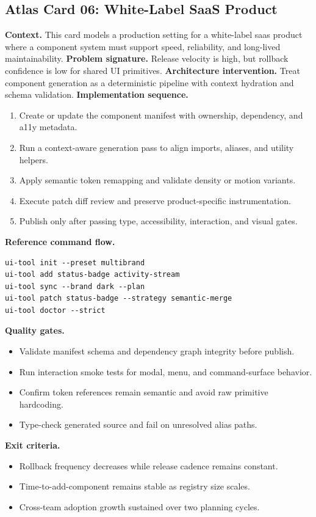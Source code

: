 \subsection*{Atlas Card 06: White-Label SaaS Product}
\textbf{Context.} This card models a production setting for a white-label saas product where a component system must support speed, reliability, and long-lived maintainability.
\textbf{Problem signature.} Release velocity is high, but rollback confidence is low for shared UI primitives.
\textbf{Architecture intervention.} Treat component generation as a deterministic pipeline with context hydration and schema validation.
\textbf{Implementation sequence.}
\begin{enumerate}[leftmargin=*, itemsep=0.28em]
  \item Create or update the component manifest with ownership, dependency, and a11y metadata.
  \item Run a context-aware generation pass to align imports, aliases, and utility helpers.
  \item Apply semantic token remapping and validate density or motion variants.
  \item Execute patch diff review and preserve product-specific instrumentation.
  \item Publish only after passing type, accessibility, interaction, and visual gates.
\end{enumerate}
\textbf{Reference command flow.}
\begin{verbatim}
ui-tool init --preset multibrand
ui-tool add status-badge activity-stream
ui-tool sync --brand dark --plan
ui-tool patch status-badge --strategy semantic-merge
ui-tool doctor --strict
\end{verbatim}
\textbf{Quality gates.}
\begin{itemize}[leftmargin=*, itemsep=0.24em]
  \item Validate manifest schema and dependency graph integrity before publish.
  \item Run interaction smoke tests for modal, menu, and command-surface behavior.
  \item Confirm token references remain semantic and avoid raw primitive hardcoding.
  \item Type-check generated source and fail on unresolved alias paths.
\end{itemize}
\textbf{Exit criteria.}
\begin{itemize}[leftmargin=*, itemsep=0.24em]
  \item Rollback frequency decreases while release cadence remains constant.
  \item Time-to-add-component remains stable as registry size scales.
  \item Cross-team adoption growth sustained over two planning cycles.
\end{itemize}
\clearpage
